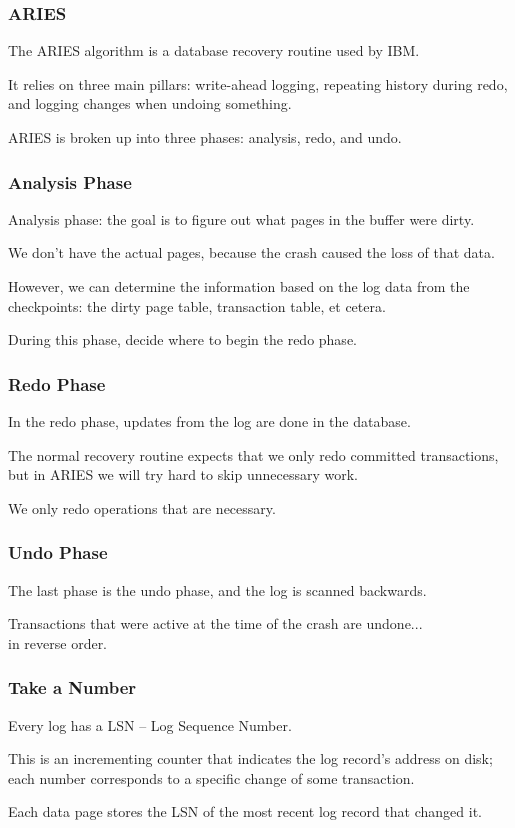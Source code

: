 \begin{frame}
\frametitle{ARIES}

The ARIES algorithm is a database recovery routine used by IBM. 

It relies on three main pillars: write-ahead logging, repeating history during redo, and logging changes when undoing something.

ARIES is broken up into three phases: analysis, redo, and undo.


\end{frame}


\begin{frame}
\frametitle{Analysis Phase}

Analysis phase: the goal is to figure out what pages in the buffer were dirty. 

We don't have the actual pages, because the crash caused the loss of that data. 

However, we can determine the information based on the log data from the checkpoints: the dirty page table, transaction table, et cetera. 

During this phase, decide where to begin the redo phase.


\end{frame}


\begin{frame}
\frametitle{Redo Phase}

In the redo phase, updates from the log are done in the database. 

The normal recovery routine expects that we only redo committed transactions, but in ARIES we will try hard to skip unnecessary work. 

We only redo operations that are necessary.


\end{frame}


\begin{frame}
\frametitle{Undo Phase}

The last phase is the undo phase, and the log is scanned backwards.

Transactions that were active at the time of the crash are undone...\\
\quad in reverse order. 


\end{frame}

\begin{frame}
\frametitle{Take a Number}

Every log has a LSN -- \alert{Log Sequence Number}. 

This is an incrementing counter that indicates the log record's address on disk; each number corresponds to a specific change of some transaction. 

Each data page stores the LSN of the most recent log record that changed it. 

\end{frame}

